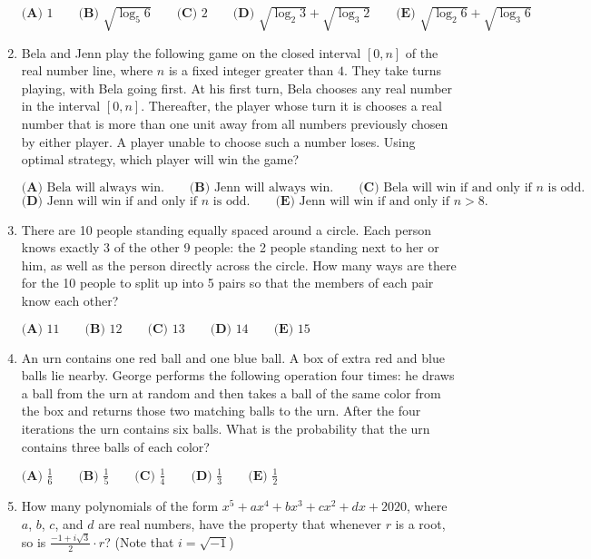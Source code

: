 \documentclass{article}
\begin{document}
\begin{enumerate}[label=\arabic*., itemsep=0.5em]
$\textbf{(A) } 1 \qquad\textbf{(B) } \sqrt{\log_5{6}} \qquad\textbf{(C) } 2 \qquad\textbf{(D) } \sqrt{\log_2{3}}+\sqrt{\log_3{2}} \qquad\textbf{(E) } \sqrt{\log_2{6}}+\sqrt{\log_3{6}}$\par \vspace{0.5em}\item Bela and Jenn play the following game on the closed interval $[0, n]$ of the real number line, where $n$ is a fixed integer greater than $4$. They take turns playing, with Bela going first. At his first turn, Bela chooses any real number in the interval $[0, n]$. Thereafter, the player whose turn it is chooses a real number that is more than one unit away from all numbers previously chosen by either player. A player unable to choose such a number loses. Using optimal strategy, which player will win the game?

$\textbf{(A)} \text{ Bela will always win.} \qquad \textbf{(B)} \text{ Jenn will always win.} \qquad \textbf{(C)} \text{ Bela will win if and only if }n \text{ is odd.}$
$\textbf{(D)} \text{ Jenn will win if and only if }n \text{ is odd.} \qquad \textbf{(E)} \text { Jenn will win if and only if } n>8.$\par \vspace{0.5em}\item There are 10 people standing equally spaced around a circle. Each person knows exactly 3 of the other 9 people: the 2 people standing next to her or him, as well as the person directly across the circle. How many ways are there for the 10 people to split up into 5 pairs so that the members of each pair know each other?

$\textbf{(A) } 11 \qquad \textbf{(B) } 12 \qquad \textbf{(C) } 13 \qquad \textbf{(D) } 14 \qquad \textbf{(E) } 15$\par \vspace{0.5em}\item An urn contains one red ball and one blue ball. A box of extra red and blue balls lie nearby. George performs the following operation four times: he draws a ball from the urn at random and then takes a ball of the same color from the box and returns those two matching balls to the urn. After the four iterations the urn contains six balls. What is the probability that the urn contains three balls of each color?

$\textbf{(A) } \frac16 \qquad \textbf{(B) }\frac15 \qquad \textbf{(C) } \frac14 \qquad \textbf{(D) } \frac13 \qquad \textbf{(E) } \frac12$\par \vspace{0.5em}\item How many polynomials of the form $x^5 + ax^4 + bx^3 + cx^2 + dx + 2020$, where $a$, $b$, $c$, and $d$ are real numbers, have the property that whenever $r$ is a root, so is $\frac{-1+i\sqrt{3}}{2} \cdot r$? (Note that $i=\sqrt{-1}$)


\end{enumerate}
\end{document}
